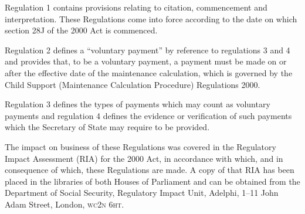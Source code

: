 \documentclass[12pt,a4paper]{article}
\begin{document}
Regulation 1 contains provisions relating to citation, commencement and interpretation. These Regulations come into force according to the date on which section 28J of the 2000 Act is commenced.

Regulation 2 defines a “voluntary payment” by reference to regulations 3 and 4 and provides that, to be a voluntary payment, a payment must be made on or after the effective date of the maintenance calculation, which is governed by the Child Support (Maintenance Calculation Procedure) Regulations 2000.

Regulation 3 defines the types of payments which may count as voluntary payments and regulation 4 defines the evidence or verification of such payments which the Secretary of State may require to be provided.

The impact on business of these Regulations was covered in the Regulatory Impact Assessment (RIA) for the 2000 Act, in accordance with which, and in consequence of which, these Regulations are made. A copy of that RIA has been placed in the libraries of both Houses of Parliament and can be obtained from the Department of Social Security, Regulatory Impact Unit, Adelphi, 1--11 John Adam Street, London, \textsc{\lowercase{WC2N 6HT}}. 
\end{document}
